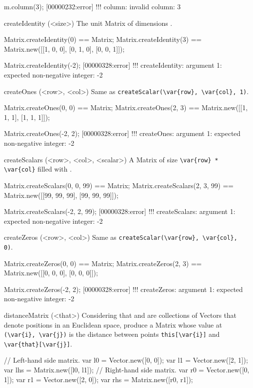 \begin{urbiscriptapi}
\begin{urbiassert}
m.column(3);
[00000232:error] !!! column: invalid column: 3
\end{urbiassert}


\item[createIdentity](<size>)%
  The unit Matrix of dimensions .
\begin{urbiassert}
Matrix.createIdentity(0) == Matrix;
Matrix.createIdentity(3) == Matrix.new([[1, 0, 0], [0, 1, 0], [0, 0, 1]]);

Matrix.createIdentity(-2);
[00000328:error] !!! createIdentity: argument 1: expected non-negative integer: -2
\end{urbiassert}


\item[createOnes](<row>, <col>)%
  Same as \lstinline|createScalar(\var{row}, \var{col}, 1)|.
\begin{urbiassert}
Matrix.createOnes(0, 0) == Matrix;
Matrix.createOnes(2, 3) == Matrix.new([[1, 1, 1], [1, 1, 1]]);

Matrix.createOnes(-2, 2);
[00000328:error] !!! createOnes: argument 1: expected non-negative integer: -2
\end{urbiassert}


\item[createScalars](<row>, <col>, <scalar>)%
  A Matrix of size \lstinline|\var{row} * \var{col}| filled with
  .
\begin{urbiassert}
Matrix.createScalars(0, 0, 99) == Matrix;
Matrix.createScalars(2, 3, 99) == Matrix.new([[99, 99, 99], [99, 99, 99]]);

Matrix.createScalars(-2, 2, 99);
[00000328:error] !!! createScalars: argument 1: expected non-negative integer: -2
\end{urbiassert}


\item[createZeros](<row>, <col>)%
  Same as \lstinline|createScalar(\var{row}, \var{col}, 0)|.
\begin{urbiassert}
Matrix.createZeros(0, 0) == Matrix;
Matrix.createZeros(2, 3) == Matrix.new([[0, 0, 0], [0, 0, 0]]);

Matrix.createZeros(-2, 2);
[00000328:error] !!! createZeros: argument 1: expected non-negative integer: -2
\end{urbiassert}


\item[distanceMatrix](<that>)%
  Considering that \this and \that are collections of Vectors that denote
  positions in an Euclidean space, produce a Matrix whose value at
  \lstinline|(\var{i}, \var{j})| is the distance between points
  \lstinline|this[\var{i}]| and \lstinline|\var{that}[\var{j}]|.
\begin{urbiassert}
// Left-hand side matrix.
var l0 = Vector.new([0, 0]);  var l1 = Vector.new([2, 1]);
var lhs = Matrix.new([l0, l1]);
// Right-hand side matrix.
var r0 = Vector.new([0, 1]);  var r1 = Vector.new([2, 0]);
var rhs = Matrix.new([r0, r1]);


\end{urbiassert}
\end{urbiscriptapi}
